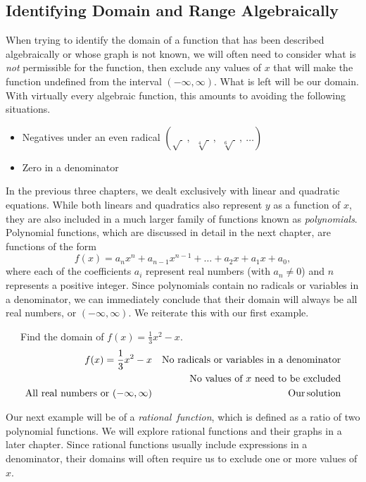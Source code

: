 \subsection{Identifying Domain and Range Algebraically}


When trying to identify the domain of a function that has been described algebraically or whose graph is not known, we will often need to consider what is \textit{not} permissible for the function, then exclude any values of $x$ that will make the function undefined from the interval $(-\infty,\infty)$.  What is left will be our domain.  With virtually every algebraic function, this amounts to avoiding the following situations.
\begin{itemize}
	\item Negatives under an even radical $\left(\sqrt{~}~,~~\sqrt[4]{~}~,~~\sqrt[6]{~}~,~\ldots\right)$
	\item Zero in a denominator
\end{itemize}
In the previous three chapters, we dealt exclusively with linear and quadratic equations.  While both linears and quadratics also represent $y$ as a function of $x$, they are also included in a much larger family of functions known as \textit{polynomials}.  Polynomial functions, which are discussed in detail in the next chapter, are functions of the form
$$f(x)=a_nx^n+a_{n-1}x^{n-1}+\ldots+a_2x+a_1x+a_0,$$
where each of the coefficients $a_i$ represent real numbers (with $a_n\neq 0$) and $n$ represents a positive integer.  Since polynomials  contain no radicals or variables in a denominator, we can immediately conclude that their domain will always be all real numbers, or $(-\infty,\infty)$.  We reiterate this with our first example.
  
\begin{example}~~~Find the domain of $f(x)=\frac{1}{3} x^2-x$.
  \begin{eqnarray*}
    f (x) = \frac{1}{3} x^2 - x & & \text{No~radicals~or~variables~in~a~denominator}\\
		& & \text{No~values~of~} x\text{~need~to~be~excluded}\\
		\operatorname{All~real~numbers~or~}(-\infty,\infty) & & \operatorname{Our} \operatorname{solution}
 \end{eqnarray*}
 \end{example}

Our next example will be of a \textit{rational~function}, which is defined as a ratio of two polynomial functions.  We will explore rational functions and their graphs in a later chapter.  Since rational functions usually include expressions in a denominator, their domains will often require us to exclude one or more values of $x$.

